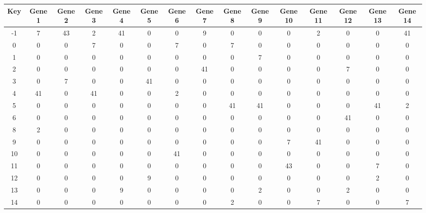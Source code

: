 \begin{tabular}{|c|c|c|c|c|c|c|c|c|c|c|c|c|c|c|}
\hline
Key & Gene 1 & Gene 2 & Gene 3 & Gene 4 & Gene 5 & Gene 6 & Gene 7 & Gene 8 & Gene 9 & Gene 10 & Gene 11 & Gene 12 & Gene 13 & Gene 14 \\
\hline
-1 & 7 & 43 & 2 & 41 & 0 & 0 & 9 & 0 & 0 & 0 & 2 & 0 & 0 & 41 \\
0 & 0 & 0 & 7 & 0 & 0 & 7 & 0 & 7 & 0 & 0 & 0 & 0 & 0 & 0 \\
1 & 0 & 0 & 0 & 0 & 0 & 0 & 0 & 0 & 7 & 0 & 0 & 0 & 0 & 0 \\
2 & 0 & 0 & 0 & 0 & 0 & 0 & 41 & 0 & 0 & 0 & 0 & 7 & 0 & 0 \\
3 & 0 & 7 & 0 & 0 & 41 & 0 & 0 & 0 & 0 & 0 & 0 & 0 & 0 & 0 \\
4 & 41 & 0 & 41 & 0 & 0 & 2 & 0 & 0 & 0 & 0 & 0 & 0 & 0 & 0 \\
5 & 0 & 0 & 0 & 0 & 0 & 0 & 0 & 41 & 41 & 0 & 0 & 0 & 41 & 2 \\
6 & 0 & 0 & 0 & 0 & 0 & 0 & 0 & 0 & 0 & 0 & 0 & 41 & 0 & 0 \\
8 & 2 & 0 & 0 & 0 & 0 & 0 & 0 & 0 & 0 & 0 & 0 & 0 & 0 & 0 \\
9 & 0 & 0 & 0 & 0 & 0 & 0 & 0 & 0 & 0 & 7 & 41 & 0 & 0 & 0 \\
10 & 0 & 0 & 0 & 0 & 0 & 41 & 0 & 0 & 0 & 0 & 0 & 0 & 0 & 0 \\
11 & 0 & 0 & 0 & 0 & 0 & 0 & 0 & 0 & 0 & 43 & 0 & 0 & 7 & 0 \\
12 & 0 & 0 & 0 & 0 & 9 & 0 & 0 & 0 & 0 & 0 & 0 & 0 & 2 & 0 \\
13 & 0 & 0 & 0 & 9 & 0 & 0 & 0 & 0 & 2 & 0 & 0 & 2 & 0 & 0 \\
14 & 0 & 0 & 0 & 0 & 0 & 0 & 0 & 2 & 0 & 0 & 7 & 0 & 0 & 7 \\
\hline
\end{tabular}